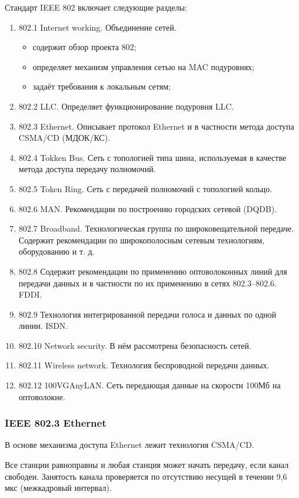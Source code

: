 \documentclass[12pt, russian, oneside, article]{ncc}
\begin{document}
Стандарт IEEE 802 включает следующие разделы:
\begin{enumerate}
\item 802.1 Internet working. Объединение сетей.

\begin{itemize}
\item содержит обзор проекта 802;
\item определяет механизм управления сетью на MAC подуровнях;
\item задаёт требования к локальным сетям;
\end{itemize}

\item 802.2 LLC. Определяет функционирование подуровня LLC.
\item 802.3 Ethernet. Описывает протокол Ethernet и в частности метода доступа CSMA/CD (МДОК/КС).
\item 802.4 Tokken Bus. Сеть с топологией типа шина, используемая в качестве метода доступа передачу полномочий.
\item 802.5 Token Ring. Сеть с передачей полномочий с топологией кольцо.
\item 802.6 MAN. Рекомендации по построению городских сетевой (DQDB).
\item 802.7 Broadband. Технологическая группа по широковещательной передаче. Содержит рекомендации по широкополосным сетевым технологиям, оборудованию и т. д.
\item 802.8 Содержит рекомендации по применению оптоволоконных линий для передачи данных и в частности по их применению в сетях 802.3--802.6. FDDI.
\item 802.9 Технология интегрированной передачи голоса и данных по одной линии. ISDN.
\item 802.10 Network security. В нём рассмотрена безопасность сетей.
\item 802.11 Wireless network. Технология беспроводной передачи данных.
\item 802.12 100VGAnyLAN. Сеть передающая данные на скорости 100Мб на оптоволокне.
\end{enumerate}
\subsubsection{IEEE 802.3 Ethernet}
\label{sec-5_2_1}


В основе механизма доступа Ethernet лежит технология CSMA/CD. 

Все станции равноправны и любая станция может начать передачу, если канал свободен. Занятость канала проверяется по отсутствию несущей в течении 9,6 мкс (межкадровый интервал).
\end{document}
